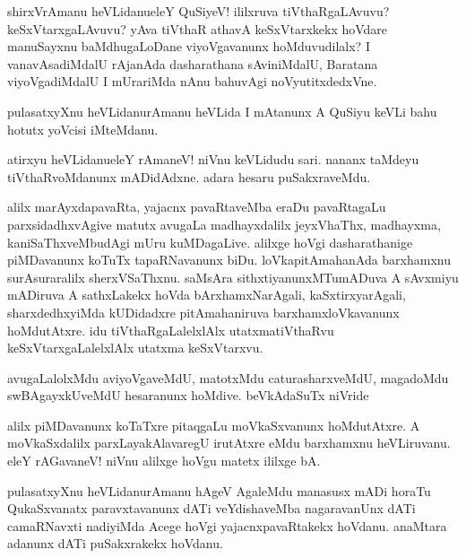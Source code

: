 \begin{mng}
shirxVrAmanu heVLidanu\mdash eleY QuSiyeV! ililxruva tiVthaRgaLAvuvu? keSxVtarxgaLAvuvu? yAva tiVthaR athavA keSxVtarxkekx hoVdare manuSayxnu baMdhugaLoDane viyoVgavanunx hoMduvudilalx? I vanavAsadiMdalU rAjanAda dasharathana sAviniMdalU, Baratana viyoVgadiMdalU I mUrariMda nAnu bahuvAgi noVyutitxdedxVne.
\end{mng}

\begin{mng}
pulasatxyXnu heVLidanu\mdash rAmanu heVLida I mAtanunx A QuSiyu keVLi bahu hotutx yoVcisi iMteMdanu.
\end{mng}

\begin{mng}
atirxyu heVLidanu\mdash eleY rAmaneV! niVnu keVLidudu sari. nananx taMdeyu tiVthaRvoMdanunx mADidAdxne. adara hesaru puSakxraveMdu.
\end{mng}

\begin{mng}
alilx marAyxdapavaRta, yajacnx pavaRtaveMba eraDu pavaRtagaLu parxsidadhxvAgive matutx avugaLa madhayxdalilx jeyxVhaThx, madhayxma, kaniSaThxveMbudAgi mUru kuMDagaLive. alilxge hoVgi dasharathanige piMDavanunx koTuTx tapaRNavanunx biDu. loVkapitAmahanAda barxhamxnu surAsuraralilx sherxVSaThxnu. saMsAra sithxtiyanunxMTumADuva A sAvxmiyu mADiruva A sathxLakekx hoVda bArxhamxNarAgali, kaSxtirxyarAgali, sharxdedhxyiMda kUDidadxre pitAmahaniruva barxhamxloVkavanunx hoMdutAtxre. idu tiVthaRgaLalelxlAlx utatxmatiVthaRvu keSxVtarxgaLalelxlAlx utatxma keSxVtarxvu.
\end{mng}

\begin{mng}
avugaLalolxMdu aviyoVgaveMdU, matotxMdu caturasharxveMdU, magadoMdu swBAgayxkUveMdU hesaranunx hoMdive. beVkAdaSuTx niVride
\end{mng}

\begin{mng}
alilx piMDavanunx koTaTxre pitaqgaLu moVkaSxvanunx hoMdutAtxre. A moVkaSxdalilx parxLayakAlavaregU irutAtxre eMdu barxhamxnu heVLiruvanu. eleY rAGavaneV! niVnu alilxge hoVgu matetx ililxge bA.
\end{mng}

\begin{mng}
pulasatxyXnu heVLidanu\mdash rAmanu hAgeV AgaleMdu manasusx mADi horaTu QukaSxvanatx paravxtavanunx dATi veYdishaveMba nagaravanUnx dATi camaRNavxti nadiyiMda Acege hoVgi yajacnxpavaRtakekx hoVdanu. anaMtara adanunx dATi puSakxrakekx hoVdanu.
\end{mng}

